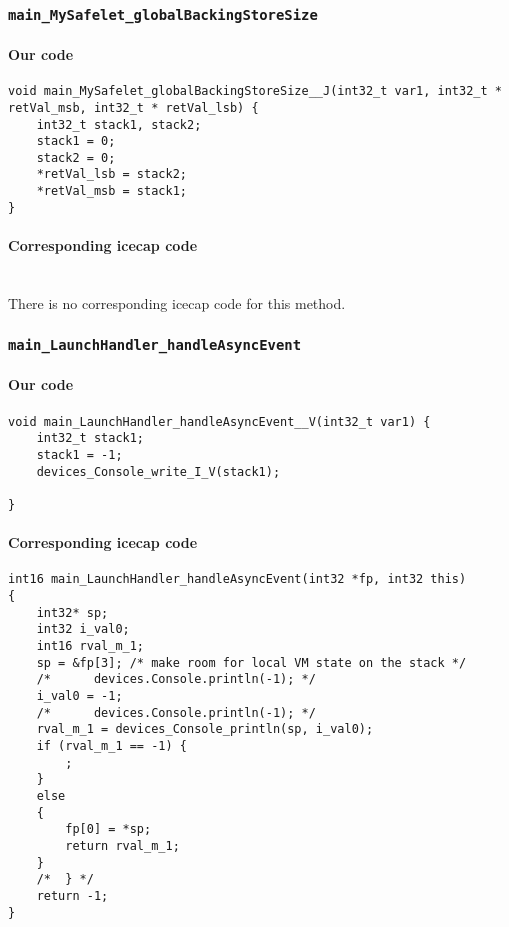 \subsubsection{\texttt{main\_MySafelet\_globalBackingStoreSize}}

\paragraph{Our code}\hfill
\begin{lstlisting}[firstnumber=262]
void main_MySafelet_globalBackingStoreSize__J(int32_t var1, int32_t * retVal_msb, int32_t * retVal_lsb) {
	int32_t stack1, stack2;
	stack1 = 0;
	stack2 = 0;
	*retVal_lsb = stack2;
	*retVal_msb = stack1;
}
\end{lstlisting}

\paragraph{Corresponding icecap code}\hfill\\
There is no corresponding icecap code for this method.


\subsubsection{\texttt{main\_LaunchHandler\_handleAsyncEvent}}

\paragraph{Our code}\hfill
\begin{lstlisting}[firstnumber=465]
void main_LaunchHandler_handleAsyncEvent__V(int32_t var1) {
	int32_t stack1;
	stack1 = -1;
	devices_Console_write_I_V(stack1);

}
\end{lstlisting}

\paragraph{Corresponding icecap code}\hfill
\begin{lstlisting}[firstnumber=55651]
int16 main_LaunchHandler_handleAsyncEvent(int32 *fp, int32 this)
{
	int32* sp;
	int32 i_val0;
	int16 rval_m_1;
	sp = &fp[3]; /* make room for local VM state on the stack */
	/*		devices.Console.println(-1); */
	i_val0 = -1;
	/*		devices.Console.println(-1); */
	rval_m_1 = devices_Console_println(sp, i_val0);
	if (rval_m_1 == -1) {
		;
	}
	else
	{
		fp[0] = *sp;
		return rval_m_1;
	}
	/*	} */
	return -1;
}
\end{lstlisting}


